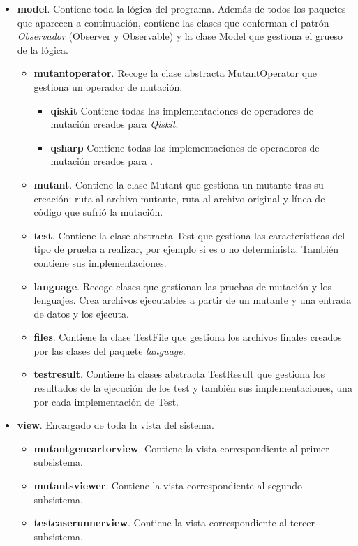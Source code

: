 \begin{itemize}
\item \textbf{model}. Contiene toda la lógica del programa. Además de todos los paquetes que aparecen a continuación, contiene las clases que conforman el patrón \textit{Observador} (Observer y Observable) y la clase Model que gestiona el grueso de la lógica.
	\begin{itemize}
	\item \textbf{mutantoperator}. Recoge la clase abstracta MutantOperator que gestiona un operador de mutación.
		\begin{itemize}
		\item \textbf{qiskit} Contiene todas las implementaciones de operadores de mutación creados para \textit{Qiskit}.
		\item \textbf{qsharp} Contiene todas las implementaciones de operadores de mutación creados para \qsh.
		\end{itemize}		 
	\item \textbf{mutant}. Contiene la clase Mutant que gestiona un mutante tras su creación: ruta al archivo mutante, ruta al archivo original y línea de código que sufrió la mutación.
	\item \textbf{test}. Contiene la clase abstracta Test que gestiona las características del tipo de prueba a realizar, por ejemplo si es o no determinista. También contiene sus implementaciones.
	\item \textbf{language}. Recoge clases que gestionan las pruebas de mutación y los lenguajes. Crea archivos ejecutables a partir de un mutante y una entrada de datos y los ejecuta.
	\item \textbf{files}. Contiene la clase TestFile que gestiona los archivos finales creados por las clases del paquete \textit{language}.
	\item \textbf{testresult}. Contiene la clases abstracta TestResult que gestiona los resultados de la ejecución de los test y también sus implementaciones, una por cada implementación de Test.
	\end{itemize}
\item \textbf{view}. Encargado de toda la vista del sistema.
	\begin{itemize}
	\item \textbf{mutantgeneartorview}. Contiene la vista correspondiente al primer subsistema.
	\item \textbf{mutantsviewer}. Contiene la vista correspondiente al segundo subsistema.
	\item \textbf{testcaserunnerview}. Contiene la vista correspondiente al tercer subsistema.

\end{itemize}
\end{itemize}
